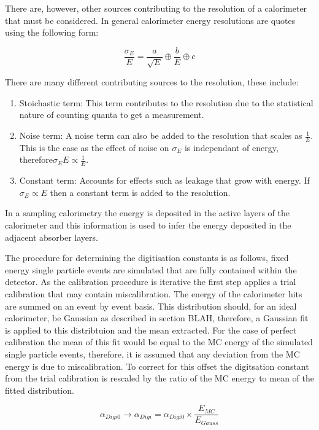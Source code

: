 There are, however, other sources contributing to the resolution of a calorimeter that must be considered.  In general calorimeter energy resolutions are quotes using the following form:

\begin{equation}
\frac{\sigma_{E}}{E} = \frac{a}{\sqrt{E}} \oplus \frac{b}{E} \oplus c
\end{equation}

There are many different contributing sources to the resolution, these include:
\begin{enumerate}
\item Stoichastic term:  This term contributes to the resolution due to the statistical nature of counting quanta to get a measurement.
\item Noise term:  A noise term can also be added to the resolution that scales as $\frac{1}{E}$.  This is the case as the effect of noise on $\sigma_{E}$ is independant of energy, therefore$\sigma_{E}{E} \propto \frac{1}{E}$.
\item Constant term:  Accounts for effects such as leakage that grow with energy.  If $\sigma_{E} \propto E$ then a constant term is added to the resolution.
\end{enumerate}

In a sampling calorimetry the energy is deposited in the active layers of the calorimeter and this information is used to infer the energy deposited in the adjacent absorber layers.

The procedure for determining the digitisation constants is as follows, fixed energy single particle events are simulated that are fully contained within the detector.  As the calibration procedure is iterative the first step applies a trial calibration that may contain miscalibration.  The energy of the calorimeter hits are summed on an event by event basis.  This distribution should, for an ideal calorimeter, be Gaussian as described in section BLAH, therefore, a Gaussian fit is applied to this distribtuion and the mean extracted.  For the case of perfect calibration the mean of this fit would be equal to the MC energy of the simulated single particle events, therefore, it is assumed that any deviation from the MC energy is due to miscalibration.  To correct for this offset the digitsation constant from the trial calibration is rescaled by the ratio of the MC energy to mean of the fitted distribution.

\begin{equation}
\alpha_{Digi0} \rightarrow \alpha_{Digi} = \alpha_{Digi0} \times \frac{E_{MC}}{E_{Gauss}}
\end{equation}

